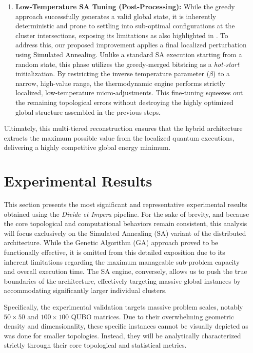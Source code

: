 \begin{enumerate}
    \item \textbf{Low-Temperature SA Tuning (Post-Processing):} 
    While the greedy approach successfully generates a valid global state, it is inherently deterministic and prone to settling into sub-optimal configurations at the cluster intersections, exposing its limitations as also highlighted in \cite{das2025grid}. To address this, our proposed improvement applies a final localized perturbation using Simulated Annealing. 
    Unlike a standard SA execution starting from a random state, this phase utilizes the greedy-merged bitstring as a \textit{hot-start} initialization. By restricting the inverse temperature parameter ($\beta$) to a narrow, high-value range, the thermodynamic engine performs strictly localized, low-temperature micro-adjustments. This fine-tuning squeezes out the remaining topological errors without destroying the highly optimized global structure assembled in the previous steps.
\end{enumerate}

Ultimately, this multi-tiered reconstruction ensures that the hybrid architecture extracts the maximum possible value from the localized quantum executions, delivering a highly competitive global energy minimum.

\section{Experimental Results}
\label{sec:divide_et_impera_results}

This section presents the most significant and representative experimental results obtained using the \textit{Divide et Impera} pipeline. For the sake of brevity, and because the core topological and computational behaviors remain consistent, this analysis will focus exclusively on the Simulated Annealing (SA) variant of the distributed architecture. While the Genetic Algorithm (GA) approach proved to be functionally effective, it is omitted from this detailed exposition due to its inherent limitations regarding the maximum manageable sub-problem capacity and overall execution time. The SA engine, conversely, allows us to push the true boundaries of the architecture, effectively targeting massive global instances by accommodating significantly larger individual clusters.

Specifically, the experimental validation targets massive problem scales, notably $50\times50$ and $100\times100$ QUBO matrices. Due to their overwhelming geometric density and dimensionality, these specific instances cannot be visually depicted as was done for smaller topologies. Instead, they will be analytically characterized strictly through their core topological and statistical metrics.

